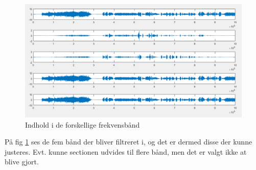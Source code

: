 \begin{figure}[H]
	\centering
	\includegraphics[width=150mm]{figures/indhold_i_band.PNG}
	\caption{Indhold i de forskellige frekvensbånd}
	\label{fig:indholdiband}
\end{figure}


På fig \ref{fig:indholdiband} ses de fem bånd der bliver filtreret i, og det er dermed disse der kunne justeres. Evt. kunne sectionen udvides til flere bånd, men det er valgt ikke at blive gjort. 


